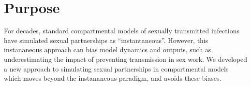 \section{Purpose}
For decades, standard compartmental models of sexually transmitted infections
have simulated sexual partnerships as ``instantaneous''.
However, this instananeous approach can bias model dynamics and outputs, such as
underestimating the impact of preventing transmission in sex work.
We developed a new approach to simulating sexual partnerships in compartmental models
which moves beyond the instananeous paradigm, and avoids these biases.
